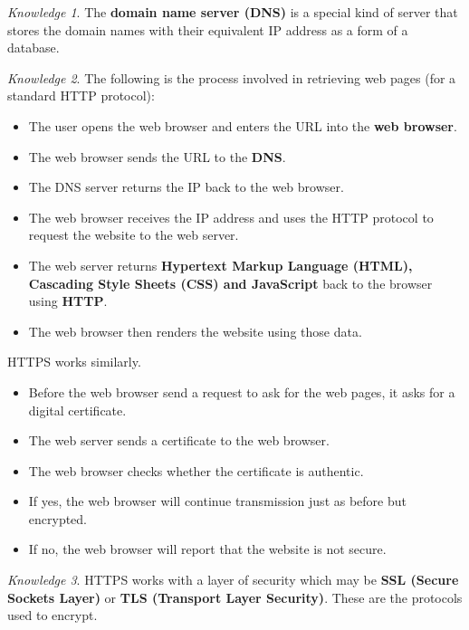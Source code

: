 \documentclass[8pt]{article}
\theoremstyle{remark}
\newtheorem{knowledge}{Knowledge}[subsection]
\begin{document}
            \begin{knowledge}
                The \textbf{domain name server (DNS)} is a special kind of server that stores the domain names with their equivalent IP address as a form of a database.
            \end{knowledge}

            \begin{knowledge}
                The following is the process involved in retrieving web pages (for a standard HTTP protocol):
                \begin{itemize}
                    \item The user opens the web browser and enters the URL into the \textbf{web browser}.
                    \item The web browser sends the URL to the \textbf{DNS}.
                    \item The DNS server returns the IP back to the web browser.
                    \item The web browser receives the IP address and uses the HTTP protocol to request the website to the web server.
                    \item The web server returns \textbf{Hypertext Markup Language (HTML), Cascading Style Sheets (CSS) and JavaScript} back to the browser using \textbf{HTTP}.
                    \item The web browser then renders the website using those data.
                \end{itemize}

                HTTPS works similarly.
                \begin{itemize}
                    \item Before the web browser send a request to ask for the web pages, it asks for a digital certificate.
                    \item The web server sends a certificate to the web browser.
                    \item The web browser checks whether the certificate is authentic.
                    \item If yes, the web browser will continue transmission just as before but encrypted.
                    \item If no, the web browser will report that the website is not secure.
                \end{itemize}
            \end{knowledge}

            \begin{knowledge}
                HTTPS works with a layer of security which may be \textbf{SSL (Secure Sockets Layer)} or \textbf{TLS (Transport Layer Security)}. These are the protocols used to encrypt.
            \end{knowledge}
\end{document}
